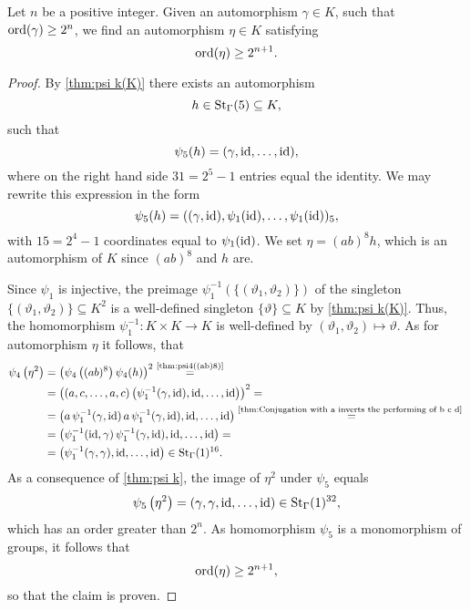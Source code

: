 \begin{lem}\label{thm:Inductive Step Infinite Growth}
Let $n$ be a positive integer. Given an automorphism $\gamma\in K$, such that $\ord(\gamma)\geq 2^n$, we find an automorphism $\eta\in K$ satisfying
\begin{equation*}
\ord(\eta)\geq 2^{n+1}. 
\end{equation*}
\end{lem}
\begin{proof}
By \cref{thm:psi k(K)} there exists an automorphism 
\begin{equation*}
h\in\St[\Gamma]{5}\subseteq K,
\end{equation*}
 such that
\begin{equation*}
\psi_5(h)=(\gamma,\id,\ldots,\id),
\end{equation*}
where on the right hand side $31=2^5-1$ entries equal the identity. We may rewrite this expression in the form
\begin{equation*}
\psi_5(h)=((\gamma,\id),\psi_1(\id),\ldots,\psi_1(\id))_5,
\end{equation*}
with $15=2^4-1$ coordinates equal to $\psi_1(\id)$. We set $\eta=(ab)^8h$, which is an automorphism of $K$ since $(ab)^8$ and $h$ are.

Since $\psi_1$ is injective, the preimage $\psi_1^{-1}(\lbrace(\vartheta_1,\vartheta_2)\rbrace)$ of the sing\-le\-ton $\lbrace(\vartheta_1,\vartheta_2)\rbrace\subseteq K^2$ is a well-defined singleton $\lbrace\vartheta\rbrace\subseteq K$ by \cref{thm:psi k(K)}. Thus, the homomorphism $\psi_1^{-1}\colon K\times K\to K$ is well-defined by $(\vartheta_1,\vartheta_2)\mapsto\vartheta$. As for automorphism $\eta$ it follows, that
\begin{align*}
\psi_4\left(\eta^2\right)	&=\left(\psi_4\left((ab)^8\right)\psi_4(h)\right)^2\overset{\text{\cref{thm:psi4((ab)8)}}}{=}\\
				&=\left((a,c,\ldots,a,c)\left(\psi_1^{-1}(\gamma,\id),\id,\ldots,\id\right)\right)^2=\\
				&=\left(a\,\psi_1^{-1}(\gamma,\id)\,a\,\psi_1^{-1}(\gamma,\id),\id,\ldots,\id\right)\overset{\text{\cref{thm:Conjugation with a inverts the performing of b c d} }}{=}\\
				&=\left(\psi_1^{-1}(\id,\gamma)\,\psi_1^{-1}(\gamma,\id),\id,\ldots,\id\right)=\\
				&=\left(\psi_1^{-1}(\gamma,\gamma),\id,\ldots,\id\right)\in\St[\Gamma]{1}^{16}.
\end{align*}
As a consequence of \cref{thm:psi k}, the  image of $\eta^2$ under $\psi_5$ equals
\begin{equation*}
\psi_5\left(\eta^2\right)=(\gamma,\gamma,\id,\ldots,\id)\in\St[\Gamma]{1}^{32},
\end{equation*}
which has an order greater than $2^n$. As homomorphism $\psi_5$ is a monomorphism of groups, it follows that
\begin{equation*}
\ord(\eta)\geq 2^{n+1},
\end{equation*}
so that the claim is proven.
\end{proof}

